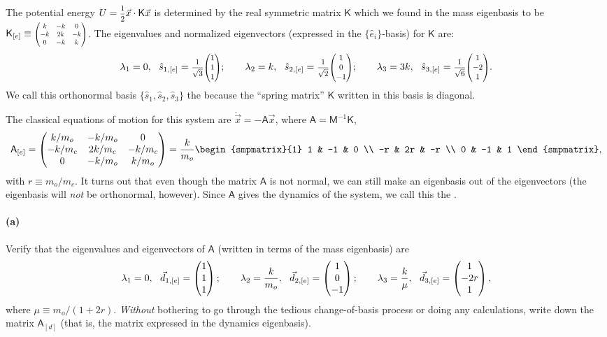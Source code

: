 \documentclass{article}
\begin{document}
The potential energy $U = \fracsm{1}{2}\vec{x}\cdot \mathsf{K}\vec{x}$ is determined by the real symmetric matrix $\mathsf{K}$ which we found in the mass eigenbasis 
to be $\mathsf{K}_{[e]} \equiv \smmatrix{0.7}{k & -k & 0\\ -k & 2k & -k \\ 0 & -k & k}$. The eigenvalues and normalized eigenvectors (expressed in the $\{\hat{e}_{i}\}$-basis) for 
$\mathsf{K}$ are:
	\begin{equation*}
		\lambda_{1} = 0,	\ \ \hat{s}_{1,[e]} = \sqrtfinv{3}\smthreevect{1}{1}{1};	\qquad
		\lambda_{2} = k,	\ \ \hat{s}_{2,[e]} = \sqrtfinv{2}\smthreevect{1}{0}{-1};	\qquad
		\lambda_{3} = 3k,	\ \ \hat{s}_{3,[e]} = \sqrtfinv{6}\smthreevect{1}{-2}{1}.
	\end{equation*}
We call this orthonormal basis $\{\hat{s}_{1},\hat{s}_{2},\hat{s}_{3}\}$ the  because the ``spring matrix'' $\mathsf{K}$ written in this basis is
diagonal.\bigskip

The classical equations of motion for this system are $\ddot{\vec{x}} = -\mathsf{A}\vec{x}$, where $\mathsf{A} = \mathsf{M}^{-1}\mathsf{K}$,
	\begin{equation*} 
		\mathsf{A}_{[e]} = \begin{pmatrix} k/m_{o} & -k/m_{o} & 0\\ -k/m_{c} & 2k/m_{c} & -k/m_{c} \\ 0 & -k/m_{o} & k/m_{o}\end{pmatrix}
		= \frac{k}{m_{o}}\begin{smpmatrix}{1} 1 & -1 & 0 \\ -r & 2r & -r \\ 0 & -1 & 1 \end{smpmatrix},
	\end{equation*}
with $r \equiv m_{o}/m_{c}$.	
It turns out that even though the matrix $\mathsf{A}$ is not normal, we can still make an eigenbasis out of the eigenvectors (the eigenbasis will \emph{not}
be orthonormal, however).  Since $\mathsf{A}$ gives the dynamics of the system, we call this the .

\phline
\paragraph{(a)}
Verify that the eigenvalues and eigenvectors of $\mathsf{A}$ (written in terms of the mass eigenbasis) are
	\begin{equation*}
		\lambda_{1} = 0,				\ \ \vec{d}_{1,[e]} = \threevect{1}{1}{1};	\qquad
		\lambda_{2} = \frac{k}{m_{o}},		\ \ \vec{d}_{2,[e]} = \threevect{1}{0}{-1};	\qquad
		\lambda_{3} = \frac{k}{\mu},		\ \ \vec{d}_{3,[e]} = \threevect{1}{-2r}{1},
	\end{equation*}
where $\mu \equiv m_{o}/(1+2r)$.  
\emph{Without} bothering to go through the tedious change-of-basis process or doing any calculations, write down 
the matrix $\mathsf{A}_{[d]}$ (that is, the matrix expressed in the dynamics eigenbasis).
\end{document}
